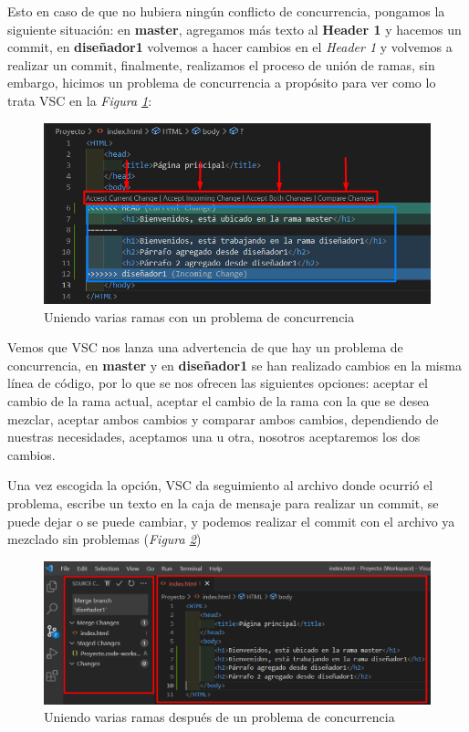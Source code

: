 Esto en caso de que no hubiera ningún conflicto de concurrencia, pongamos la siguiente situación: en \textbf{master}, agregamos más texto al \textbf{Header 1} y hacemos un commit, en \textbf{diseñador1} volvemos a hacer cambios en el \textit{Header 1} y volvemos a realizar un commit, finalmente, realizamos el proceso de unión de ramas, sin embargo, hicimos un problema de concurrencia a propósito para ver como lo trata VSC en la \textit{Figura \ref{fig: 25}}:
\begin{figure}[H]
    \centering
    \caption{Uniendo varias ramas con un problema de concurrencia}
    \label{fig: 25}
    \includegraphics[width=13cm]{capturas/merge3.png}
\end{figure}

Vemos que VSC nos lanza una advertencia de que hay un problema de concurrencia, en \textbf{master} y en \textbf{diseñador1} se han realizado cambios en la misma línea de código, por lo que se nos ofrecen las siguientes opciones: aceptar el cambio de la rama actual, aceptar el cambio de la rama con la que se desea mezclar, aceptar ambos cambios y comparar ambos cambios, dependiendo de nuestras necesidades, aceptamos una u otra, nosotros aceptaremos los dos cambios.

Una vez escogida la opción, VSC da seguimiento al archivo donde ocurrió el problema, escribe un texto en la caja de mensaje para realizar un commit, se puede dejar o se puede cambiar, y podemos realizar el commit con el archivo ya mezclado sin problemas (\textit{Figura \ref{fig: 26}})
\begin{figure}[H]
    \centering
    \caption{Uniendo varias ramas después de un problema de concurrencia}
    \label{fig: 26}
    \includegraphics[width=13cm]{capturas/merge4.png}
\end{figure}

